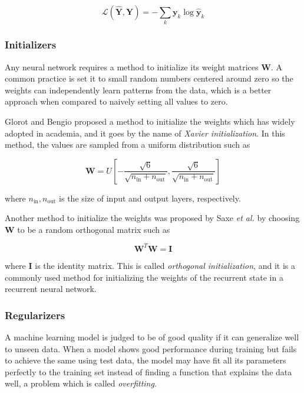 \documentclass{kththesis}
\begin{document}
\begin{equation}
\mathcal{L}(\hat{\mathbf{Y}}, \mathbf{Y}) = - \sum_k \mathbf{y}_k \log \hat{\mathbf{y}}_k
\end{equation}

\subsubsection{Initializers}

Any neural network requires a method to initialize its weight matrices $\mathbf{W}$. A common practice is set it to small random numbers centered around zero so the weights can independently learn patterns from the data, which is a better approach when compared to naively setting all values to zero. 

Glorot and Bengio\citep{glorot2010understanding} proposed a method to initialize the weights which has widely adopted in academia, and it goes by the name of \emph{Xavier initialization}. In this method, the values are sampled from a uniform distribution such as

\begin{equation}
\mathbf{W} = \mathit{U}[-\frac{\sqrt{6}}{\sqrt{n_\text{in}+n_\text{out}}}, \frac{\sqrt{6}}{\sqrt{n_\text{in}+n_\text{out}}}] 
\end{equation}

where $n_\text{in}, n_\text{out}$ is the size of input and output layers, respectively. 

Another method to initialize the weights was proposed by Saxe \emph{et al.}\citep{saxe2013exact} by choosing $\mathbf{W}$ to be a random orthogonal matrix such as 

\begin{equation}
\mathbf{W}^T\mathbf{W} = \mathbf{I}
\end{equation}

where $\mathbf{I}$ is the identity matrix. This is called \emph{orthogonal initialization}, and it is a commonly used method for initializing the weights of the recurrent state in a recurrent neural network.

\subsubsection{Regularizers}

A machine learning model is judged to be of good quality if it can generalize well to unseen data. When a model shows good performance during training but fails to achieve the same using test data, the model may have fit all its parameters perfectly to the training set instead of finding a function that explains the data well, a problem which is called \emph{overfitting}. 
\end{document}
